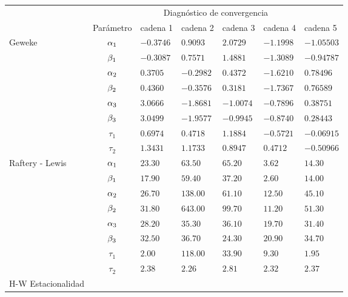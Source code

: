 

\begin{table}[!h]
\centering
\begin{tabular}{|l|c|l|l|l|l|l|}
\hline
& \multicolumn{6}{|c|}{Diagnóstico de convergencia} \\
\cline{2-7}
& Parámetro & cadena 1  & cadena 2  & cadena 3 & cadena 4 & cadena 5	 \\
\hline \hline

\multirow{8}{2.5cm}{Geweke}
& $\alpha_1$ & $ -0.3746 $ & $0.9093$ & $2.0729  $ & $ -1.1998$  & $ -1.05503$\\ 
\cline{2-7}
& $\beta_1$& $-0.3087  $ & $0.7571$ & $1.4881 $ & $ -1.3089$ & $ -0.94787$\\
\cline{2-7}
& $\alpha_2$& $0.3705 $ & $-0.2982$ & $0.4372$ & $-1.6210$ & $ 0.78496 $\\
\cline{2-7}
& $\beta_2$& $0.4360 $ & $-0.3576$ & $ 0.3181$ & $-1.7367$ & $0.76589$\\
\cline{2-7}
& $\alpha_3$& $3.0666  $ & $-1.8681$ & $-1.0074$ & $-0.7896$ & $ 0.38751 $\\
\cline{2-7}
& $\beta_3$& $3.0499 $ & $-1.9577$ & $ -0.9945$ & $ -0.8740$ & $0.28443$\\
\cline{2-7}
& $\tau_1$& $0.6974  $ & $0.4718$ & $1.1884$ & $ -0.5721$ & $-0.06915$\\
\cline{2-7}
& $\tau_2 $& $1.3431$ & $1.1733$ & $0.8947$ & $ 0.4712$ & $-0.50966$\\
\cline{1-7}

\multirow{8}{2.5cm}{Raftery - Lewis} 
& $\alpha_1$ & $23.30 $ & $63.50 $ & $65.20 $ & $3.62 $  & $ 14.30$\\ 
\cline{2-7}
& $\beta_1$& $17.90$ & $59.40 $ & $37.20$ & $2.60$ & $14.00 $\\
\cline{2-7}
& $\alpha_2$ & $ 26.70 $ & $138.00 $ & $61.10$ & $12.50$ & $45.10 $\\
\cline{2-7}
& $\beta_2$ & $31.80 $ & $643.00  $ & $99.70$ & $11.20$ & $ 51.30 $\\
\cline{2-7}
& $\alpha_3$ & $ 28.20 $ & $35.30$ & $ 36.10$ & $19.70$ & $31.40$\\
\cline{2-7}
& $\beta_3$ & $32.50 $ & $36.70 $ & $24.30$ & $20.90$ & $ 34.70$\\
\cline{2-7}
& $\tau_1$& $ 2.00 $ & $118.00 $ & $33.90$ & $ 9.30$ & $1.95 $\\
\cline{2-7}
& $\tau_2 $& $2.38 $ & $2.26$ & $2.81$ & $ 2.32$ & $ 2.37 $\\
\cline{1-7}
\multirow{8}{2.5cm}{H-W Estacionalidad} 


\end{tabular}
\end{table}
